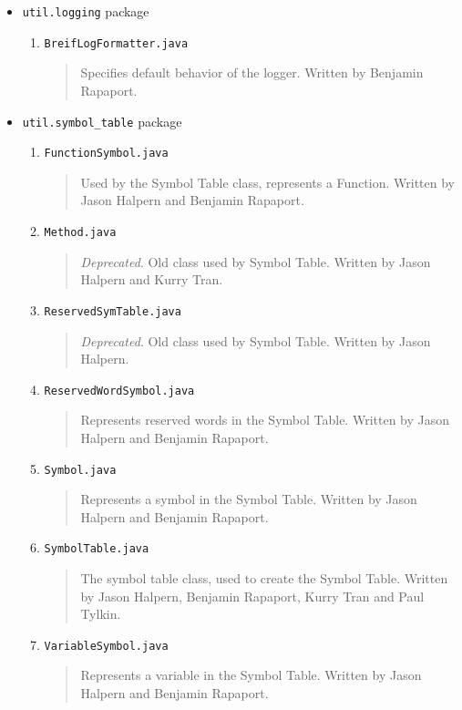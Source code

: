 \documentclass{report}
\begin{document}
\begin{itemize}
\item \texttt{util.logging} package
\begin{enumerate}
\item \texttt{BreifLogFormatter.java}
\begin{quotation}
\noindent Specifies default behavior of the logger. Written by Benjamin Rapaport. 
\end{quotation}
\end{enumerate} %
\item \texttt{util.symbol\_table} package
\begin{enumerate}
\item \texttt{FunctionSymbol.java}
\begin{quotation}
\noindent Used by the Symbol Table class, represents a Function. Written by Jason Halpern and Benjamin Rapaport. 
\end{quotation}
\item \texttt{Method.java}
\begin{quotation}
\noindent \emph{Deprecated}. Old class used by Symbol Table. Written by Jason Halpern and Kurry Tran.
\end{quotation}
\item \texttt{ReservedSymTable.java}
\begin{quotation}
\noindent \emph{Deprecated}. Old class used by Symbol Table. Written by Jason Halpern.
\end{quotation}
\item \texttt{ReservedWordSymbol.java}
\begin{quotation}
\noindent Represents reserved words in the Symbol Table. Written by Jason Halpern and Benjamin Rapaport. 
\end{quotation}
\item \texttt{Symbol.java}
\begin{quotation}
\noindent Represents a symbol in the Symbol Table. Written by Jason Halpern and Benjamin Rapaport. 
\end{quotation}
\item \texttt{SymbolTable.java}
\begin{quotation}
\noindent The symbol table class, used to create the Symbol Table. Written by Jason Halpern, Benjamin Rapaport, Kurry Tran and Paul Tylkin. 
\end{quotation}
\item \texttt{VariableSymbol.java}
\begin{quotation}
\noindent Represents a variable in the Symbol Table. Written by Jason Halpern and Benjamin Rapaport. 

\end{quotation}
\end{enumerate}
\end{itemize}
\end{document}
